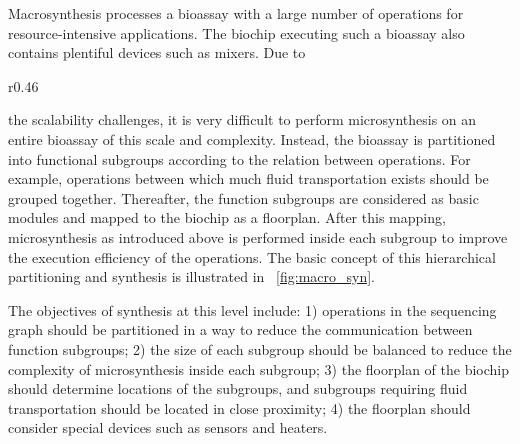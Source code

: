 Macrosynthesis processes a bioassay with
a large number of operations for resource-intensive
applications. %
The biochip executing such a bioassay also contains
plentiful devices such as mixers.
Due to 
%
\begin{wrapfigure}[25]{r}{0.46\textwidth}
{
\vskip -3pt
\figurefontsize
\centering

\caption{Synthesis at the macrolevel.} 
\label{fig:macro_syn}
}
\end{wrapfigure}
%
the scalability challenges,
it is very difficult to perform microsynthesis 
on an entire bioassay 
of this scale and complexity. Instead, the bioassay is
partitioned into functional subgroups 
according to the 
relation
between operations. For example, operations between which much fluid transportation
exists should be grouped together. %
Thereafter, the function subgroups are considered as basic modules and mapped
to the biochip as a floorplan. 
After this mapping, microsynthesis as introduced above is performed inside each
subgroup to
improve the execution efficiency of the operations. 
The basic concept of this hierarchical partitioning and synthesis is illustrated in
\figname~\ref{fig:macro_syn}.


The objectives of synthesis at this level include: 1) operations in the
sequencing graph should be partitioned in a way to reduce the communication between
function subgroups; 2) the size of each subgroup should be balanced to reduce the
complexity of microsynthesis inside each subgroup; 3) the floorplan %
of the biochip should determine locations of the subgroups, and subgroups requiring
fluid transportation should 
be located in close proximity;
4) the floorplan
should consider special devices such as sensors and heaters.


